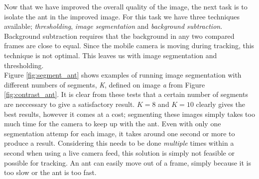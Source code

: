 Now that we have improved the overall quality of the image, the next task is to isolate the ant in the improved image. For this task we have three techniques available; \emph{thresholding}, \emph{image segmentation} and \emph{background subtraction}. Background subtraction requires that the background in any two compared frames are close to equal. Since the mobile camera is moving during tracking, this technique is not optimal. This leaves us with image segmentation and thresholding.\\

Figure \ref{fig:segment_ant} shows examples of running image segmentation with different numbers of segments, \textit{K}, defined on image \emph{a} from Figure \ref{fig:contrast_ant}. It is clear from these tests that a certain number of segments are neccessary to give a satisfactory result. $K=8$ and $K=10$ clearly gives the best results, however it comes at a cost; segmenting these images simply takes too much time for the camera to keep up with the ant. Even with only one segmentation attemp for each image, it takes around one second or more to produce a result. Considering this needs to be done \emph{multiple} times within a second when using a live camera feed, this solution is simply not feasible or possible for tracking. An ant can easily move out of a frame, simply because it is too slow or the ant is too fast.\\

